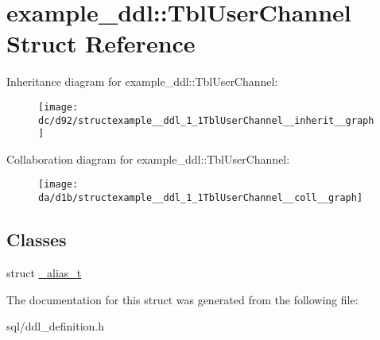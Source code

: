 \hypertarget{structexample__ddl_1_1TblUserChannel}{}\section{example\+\_\+ddl\+:\+:Tbl\+User\+Channel Struct Reference}
\label{structexample__ddl_1_1TblUserChannel}


Inheritance diagram for example\+\_\+ddl\+:\+:Tbl\+User\+Channel\+:
\nopagebreak
\begin{figure}[H]
\begin{center}
\leavevmode
\texttt{[image: dc/d92/structexample\_\_ddl\_1\_1TblUserChannel\_\_inherit\_\_graph]}
\end{center}
\end{figure}


Collaboration diagram for example\+\_\+ddl\+:\+:Tbl\+User\+Channel\+:
\nopagebreak
\begin{figure}[H]
\begin{center}
\leavevmode
\texttt{[image: da/d1b/structexample\_\_ddl\_1\_1TblUserChannel\_\_coll\_\_graph]}
\end{center}
\end{figure}
\subsection*{Classes}
\begin{DoxyCompactItemize}
\item 
struct \hyperlink{structexample__ddl_1_1TblUserChannel_1_1__alias__t}{\+\_\+alias\+\_\+t}
\end{DoxyCompactItemize}


The documentation for this struct was generated from the following file\+:\begin{DoxyCompactItemize}
\item 
sql/ddl\+\_\+definition.\+h\end{DoxyCompactItemize}
